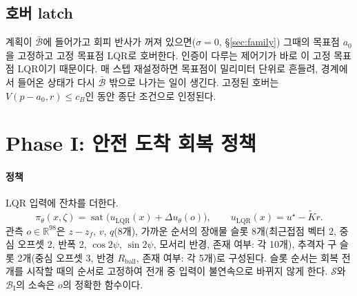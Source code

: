 \documentclass[10pt,a4paper]{article}
\newcommand{\R}{\mathbb{R}}
\newcommand{\sat}{\operatorname{sat}}
\newcommand{\Safe}{\mathcal{S}}
\newcommand{\Base}{\bar{\mathcal{B}}}
\newcommand{\BaseP}{\mathcal{B}_{\mathrm{I}}}
\newcommand{\ustar}{u^{\star}}
\begin{document}
\subsection{호버 latch}
계획이 $\Base$에 들어가고 회피 반사가 꺼져 있으면($\sigma=0$, \S\ref{sec:family}) 그때의 목표점 $a_0$을 고정하고 고정 목표점 LQR로 호버한다.
인증이 다루는 제어기가 바로 이 고정 목표점 LQR이기 때문이다. 매 스텝 재설정하면 목표점이 밀리미터 단위로 흔들려, 경계에서 들어온 상태가 다시 $\Base$ 밖으로 나가는 일이 생긴다.
고정된 호버는 $V(p-a_0,r)\le c_B$인 동안 종단 조건으로 인정된다.

\section{Phase I: 안전 도착 회복 정책}\label{sec:phase1}

\paragraph{정책} LQR 입력에 잔차를 더한다.
\begin{equation}
\pi_\theta(x,\zeta)=\sat\big(u_{\mathrm{LQR}}(x)+\Delta u_\theta(o)\big),\qquad u_{\mathrm{LQR}}(x)=\ustar-\tilde Kr .
\label{eq:phase1-policy}
\end{equation}
관측 $o\in\R^{98}$은 $z-z_f$, $v$, $q$(8개), 가까운 순서의 장애물 슬롯 8개(최근접점 벡터 2, 중심 오프셋 2, 반폭 2, $\cos2\psi$, $\sin2\psi$, 모서리 반경, 존재 여부: 각 10개), 추격자 구 슬롯 2개(중심 오프셋 3, 반경 $R_{\mathrm{ball}}$, 존재 여부: 각 5개)로 구성된다.
슬롯 순서는 회복 전개를 시작할 때의 순서로 고정하여 전개 중 입력이 불연속으로 바뀌지 않게 한다. $\Safe$와 $\BaseP$의 소속은 $o$의 정확한 함수이다.
\end{document}
